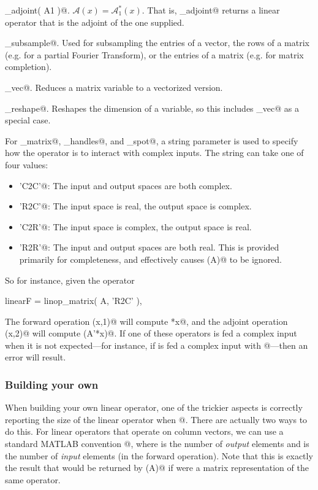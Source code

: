 \documentclass{article}
\newcommand{\cA}{\ensuremath{\mathcal{A}}}    %
\newcommand{\<}{\langle}
\renewcommand{\>}{\rangle}
\begin{document}
\begin{trivlist}
\item \verb@linop_adjoint( A1 )@. $\cA(x) = \cA_1^*(x)$. That is, \verb@linop_adjoint@
returns a linear operator that is the adjoint of the one supplied.
\item \verb@linop_subsample@.  Used for subsampling the entries of a vector, the rows of a matrix (e.g. for a partial Fourier Transform), or the entries of a matrix (e.g. for matrix completion).
\item \verb@linop_vec@. Reduces a matrix variable to a vectorized version.
\item \verb@linop_reshape@. Reshapes the dimension of a variable, so this includes \verb@linop_vec@ as a special case.
\end{trivlist}

For \verb@linop_matrix@, \verb@linop_handles@, and \verb@linop_spot@, a
string parameter \verb@cmode@ is used to specify how the operator is to interact
with complex inputs. The string can take one of four values:
\begin{itemize}
\item \verb@'C2C'@: The input and output spaces are both complex.
\item \verb@'R2C'@: The input space is real, the output space is complex.
\item \verb@'C2R'@: The input space is complex, the output space is real.
\item \verb@'R2R'@: The input and output spaces are both real. This is provided
primarily for completeness, and effectively causes \verb@imag(A)@ to be ignored.
\end{itemize}
So for instance, given the operator
\begin{code}
	linearF = linop_matrix( A, 'R2C' ),
\end{code}
The forward operation \verb@linearF(x,1)@ will compute \verb@A*x@, and the
adjoint operation \verb@linearF(x,2)@ will compute \verb@real(A'*x)@. If
one of these operators is fed a complex input when it is not expected---for
instance, if \verb@linearF@ is fed a complex input with @---then
an error will result.

\subsubsection{Building your own}
\label{sec:linearb}

When building your own linear operator, one of the trickier
aspects is correctly reporting the size of the linear operator when
@. There are actually two ways to do this. For linear
operators that operate on column vectors, we can use a standard MATLAB
convention \verb@[m,n]@, where \verb@m@ is the number of \emph{output} elements and
\verb@n@ is the number of \verb@n@ \emph{input} elements (in the forward operation).
Note that this is exactly the result that would be returned by \verb@size(A)@ if \verb@A@
were a matrix representation of the same operator.
\end{document}

